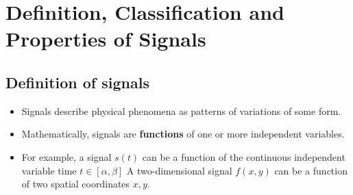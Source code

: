 \documentclass[12pt,a4paper]{article}
\begin{document}
\newpage
\tableofcontents%


\newpage
\section{Definition, Classification and Properties of Signals}
\subsection{Definition of signals}
 \begin{itemize}
 \item  Signals describe physical phenomena as patterns of variations of some form.
 \item Mathematically, signals are \textbf{functions} of one or more independent variables.
 \item For example, a signal $s(t)$ can be a function of the continuous independent variable time $t \in [\alpha, \beta]$ A two-dimensional signal $f(x, y)$ can be a function of two spatial coordinates $x, y$.
 \end{itemize}
\end{document}
